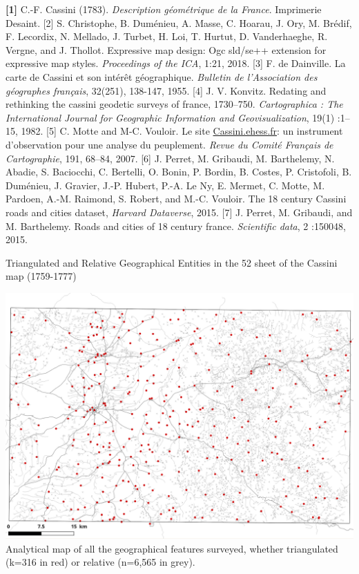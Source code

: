 \documentclass[portrait,a0]{sciposter}
\begin{document}
\begin{minipage}[b]{\textwidth}
\begin{multicols}{3}
\small
\textbf{[1]} C.-F. Cassini (1783). \textit{Description géométrique de la France}. Imprimerie Desaint.
[2] S. Christophe, B. Duménieu, A. Masse, C. Hoarau, J. Ory, M. Brédif, F. Lecordix, N. Mellado, J. Turbet, H. Loi, T. Hurtut, D. Vanderhaeghe, R. Vergne, and J. Thollot. Expressive map design: Ogc sld/se++ extension for expressive map styles. \textit{Proceedings of the ICA}, 1:21, 2018.
[3] F. de Dainville. La carte de Cassini et son intérêt géographique. \textit{Bulletin de l'Association des géographes français}, 32(251), 138-147, 1955.
[4] J. V. Konvitz. Redating and rethinking the cassini geodetic surveys of france, 1730–750. \textit{Cartographica : The International Journal for Geographic Information and Geovisualization}, 19(1) :1–15, 1982.
[5] C. Motte and M-C. Vouloir. Le site \href{http://cassini.ehess.fr}{Cassini.ehess.fr}: un instrument d’observation pour une analyse du peuplement. \textit{Revue du Comité Français de Cartographie}, 191, 68–84, 2007.
[6] J. Perret, M. Gribaudi, M. Barthelemy, N. Abadie, S. Baciocchi, C. Bertelli, O. Bonin, P. Bordin, B. Costes, P. Cristofoli, B. Duménieu, J. Gravier, J.-P. Hubert, P.-A. Le Ny, E. Mermet, C. Motte, M. Pardoen, A.-M. Raimond, S. Robert, and M.-C. Vouloir. The 18 century Cassini roads and cities dataset, \textit{Harvard Dataverse}, 2015.
[7] J. Perret, M. Gribaudi, and M. Barthelemy. Roads and cities of 18 century france. \textit{Scientific data}, 2 :150048, 2015.

\begin{center}
 \captionsetup{type=figure}
 \caption{Triangulated and Relative Geographical Entities in the 52 sheet of the Cassini map (1759-1777)}
 \label{map:triangulated-relative}
 \includegraphics[width=0.9\linewidth]{gfx/Triangulated.png}
 \vfill
 \footnotesize
 Analytical map of all the geographical features surveyed, whether triangulated (k=316 in red) or relative (n=6,565 in grey).
\end{center}
\end{multicols}
\end{minipage}
\end{document}
